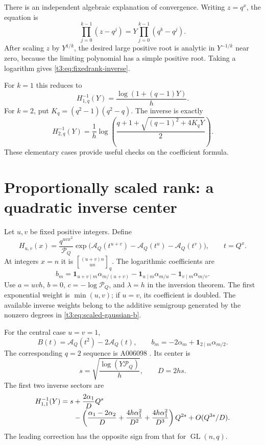 \documentclass[11pt,openany]{book}
\numberwithin{equation}{chapter}
\theoremstyle{plain}
\theoremstyle{definition}
\theoremstyle{remark}
\newcommand{\qbinq}[2]{\genfrac{[}{]}{0pt}{}{#1}{#2}_{q}}   %
\newcommand{\Pinf}{\mathcal P_Q}
\newcommand{\A}{\mathcal A_Q}
\newcommand{\one}{\mathbf 1}
\newcommand{\GL}{\operatorname{GL}}\newcommand{\Sp}{\operatorname{Sp}}
\begin{document}
There is an independent algebraic explanation of convergence. Writing $z=q^x$, the equation is
\begin{equation}\label{t3:eq:fixedrank-algebraic}
 \prod_{j=0}^{k-1}(z-q^j)=Y\prod_{j=0}^{k-1}(q^k-q^j).
\end{equation}
After scaling $z$ by $Y^{1/k}$, the desired large positive root is analytic in $Y^{-1/k}$ near zero, because the limiting polynomial has a simple positive root. Taking a logarithm gives \eqref{t3:eq:fixedrank-inverse}.

For $k=1$ this reduces to
\[
 H_{1,q}^{-1}(Y)=\frac{\log(1+(q-1)Y)}h.
\]
For $k=2$, put $K_q=(q^2-1)(q^2-q)$. The inverse is exactly
\begin{equation}\label{t3:eq:k2-inverse}
 H_{2,q}^{-1}(Y)=\frac1h\log\left(
 \frac{q+1+\sqrt{(q-1)^2+4K_qY}}2\right).
\end{equation}
These elementary cases provide useful checks on the coefficient formula.

\section{Proportionally scaled rank: a quadratic inverse center}

Let $u,v$ be fixed positive integers. Define
\begin{equation}\label{t3:eq:scaled-gaussian}
 H_{u,v}(x)=\frac{q^{uvx^2}}{\Pinf}
 \exp\bigl(\A(t^{u+v})-\A(t^u)-\A(t^v)\bigr),
 \qquad t=Q^x.
\end{equation}
At integers $x=n$ it is $\qbinq{(u+v)n}{un}$. The logarithmic coefficients are
\begin{equation}\label{t3:eq:scaled-gaussian-b}
 b_m=\one_{u+v\mid m}\alpha_{m/(u+v)}
     -\one_{u\mid m}\alpha_{m/u}
     -\one_{v\mid m}\alpha_{m/v}.
\end{equation}
Use $a=uvh$, $b=0$, $c=-\log\Pinf$, and $\lambda=h$ in the inversion theorem. The first exponential weight is $\min(u,v)$; if $u=v$, its coefficient is doubled. The available inverse weights belong to the additive semigroup generated by the nonzero degrees in \eqref{t3:eq:scaled-gaussian-b}.

For the central case $u=v=1$,
\begin{equation}\label{t3:eq:central-B}
 B(t)=\A(t^2)-2\A(t),\qquad
 b_m=-2\alpha_m+\one_{2\mid m}\alpha_{m/2}.
\end{equation}
The corresponding $q=2$ sequence is A006098 \cite{oeiscentral}. Its center is
\begin{equation}\label{t3:eq:central-center}
 s=\sqrt{\frac{\log(Y\Pinf)}h},\qquad D=2hs.
\end{equation}
The first two inverse sectors are
\begin{align}\label{t3:eq:central-inverse}
 H_{1,1}^{-1}(Y)=s
 &+\frac{2\alpha_1}{D}Q^s\\[-0.3em]
 &-\left(\frac{\alpha_1-2\alpha_2}{D}
       +\frac{4h\alpha_1^2}{D^2}
       +\frac{4h\alpha_1^2}{D^3}\right)Q^{2s}
 +O(Q^{3s}/D).\notag
\end{align}
The leading correction has the opposite sign from that for $\GL(n,q)$.
\end{document}
